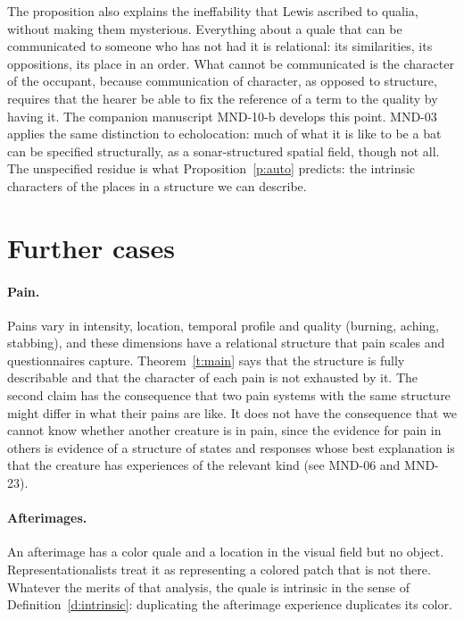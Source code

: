 \documentclass{situationist-preprint}
\begin{document}
The proposition also explains the ineffability that Lewis ascribed to qualia, without making them mysterious. Everything about a quale that can be communicated to someone who has not had it is relational: its similarities, its oppositions, its place in an order. What cannot be communicated is the character of the occupant, because communication of character, as opposed to structure, requires that the hearer be able to fix the reference of a term to the quality by having it. The companion manuscript MND-10-b develops this point. MND-03 applies the same distinction to echolocation: much of what it is like to be a bat can be specified structurally, as a sonar-structured spatial field, though not all. The unspecified residue is what Proposition~\ref{p:auto} predicts: the intrinsic characters of the places in a structure we can describe.

\section{Further cases}

\paragraph{Pain.} Pains vary in intensity, location, temporal profile and quality (burning, aching, stabbing), and these dimensions have a relational structure that pain scales and questionnaires capture. Theorem~\ref{t:main} says that the structure is fully describable and that the character of each pain is not exhausted by it. The second claim has the consequence that two pain systems with the same structure might differ in what their pains are like. It does not have the consequence that we cannot know whether another creature is in pain, since the evidence for pain in others is evidence of a structure of states and responses whose best explanation is that the creature has experiences of the relevant kind (see MND-06 and MND-23).

\paragraph{Afterimages.} An afterimage has a color quale and a location in the visual field but no object. Representationalists treat it as representing a colored patch that is not there. Whatever the merits of that analysis, the quale is intrinsic in the sense of Definition~\ref{d:intrinsic}: duplicating the afterimage experience duplicates its color.
\end{document}
